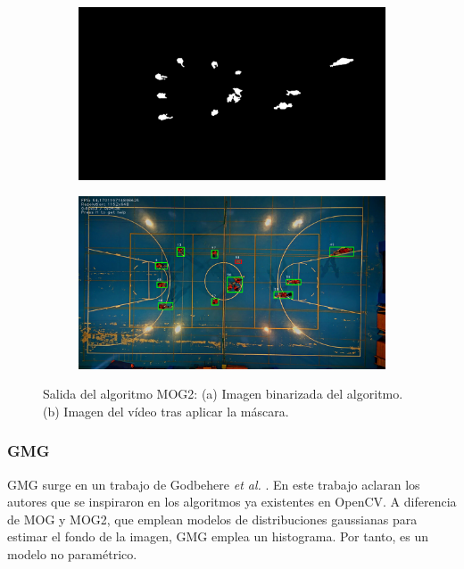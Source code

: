 \begin{figure}
\begin{subfigure}{.5\textwidth}
  \centering
  \includegraphics[width=.9\linewidth]{images/MOG2sub}
  \caption { }
  \label{fig:MOG21a}
\end{subfigure}%
\begin{subfigure}{.5\textwidth}
  \centering
  \includegraphics[width=.9\linewidth]{images/MOG2}
  \caption { }
  \label{fig:MOG21b}
\end{subfigure}
\caption{Salida del algoritmo MOG2: (a) Imagen binarizada del algoritmo. (b) Imagen del vídeo tras aplicar la máscara.}
\label{fig:MOG2}
\end{figure}

\subsubsection*{GMG}
GMG surge en un trabajo de Godbehere \textit{et al.} \cite{art:Godbehere}. En este trabajo aclaran los autores que se inspiraron en los algoritmos ya existentes en OpenCV. A diferencia de MOG y MOG2, que emplean modelos de distribuciones gaussianas para estimar el fondo de la imagen, GMG emplea un histograma. Por tanto, es un modelo no paramétrico.

